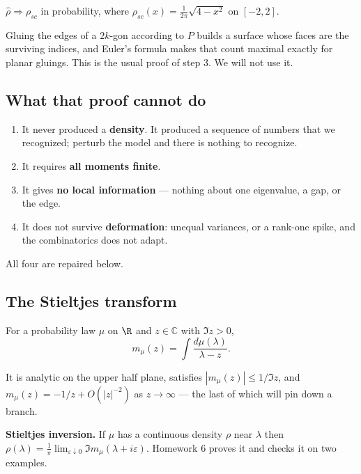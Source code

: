 \documentclass[11pt]{article}
\newcommand{\C}{\mathbb{C}}
\begin{document}
\begin{theorem}[Wigner]\label{thm:semicircle}
$\hat\rho\Rightarrow\rho_{sc}$ in probability, where $\displaystyle\rho_{sc}(x)=\frac{1}{2\pi}\sqrt{4-x^2}$ on $[-2,2]$.
\end{theorem}

\begin{remark}
Gluing the edges of a $2k$-gon according to $P$ builds a surface whose faces are the surviving indices, and Euler's formula makes that count maximal exactly for planar gluings. This is the usual proof of step 3. We will not use it.
\end{remark}

\subsection{What that proof cannot do}

\begin{enumerate}[label=(\roman*),leftmargin=1.9em,itemsep=0.1em]
\item It never produced a \textbf{density}. It produced a sequence of numbers that we recognized; perturb the model and there is nothing to recognize.
\item It requires \textbf{all moments finite}.
\item It gives \textbf{no local information} --- nothing about one eigenvalue, a gap, or the edge.
\item It does not survive \textbf{deformation}: unequal variances, or a rank-one spike, and the combinatorics does not adapt.
\end{enumerate}

All four are repaired below.

\subsection{The Stieltjes transform}

\begin{definition}\label{def:stieltjes}
For a probability law $\mu$ on $\R$ and $z\in\C$ with $\Im z>0$,
\[
m_\mu(z)=\int\frac{d\mu(\lambda)}{\lambda-z}.
\]
\end{definition}

It is analytic on the upper half plane, satisfies $|m_\mu(z)|\le1/\Im z$, and $m_\mu(z)=-1/z+O(|z|^{-2})$ as $z\to\infty$ --- the last of which will pin down a branch.

\begin{imported}
\textbf{Stieltjes inversion.} If $\mu$ has a continuous density $\rho$ near $\lambda$ then $\rho(\lambda)=\frac1\pi\lim_{\varepsilon\downarrow0}\Im m_\mu(\lambda+i\varepsilon)$. Homework 6 proves it and checks it on two examples.
\end{imported}
\end{document}
